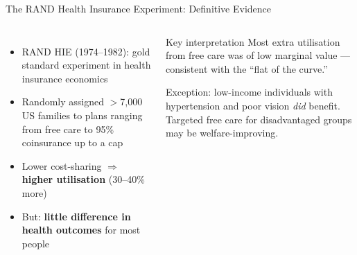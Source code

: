 \documentclass[aspectratio=169, 12pt]{beamer}
\begin{document}
\begin{frame}{The RAND Health Insurance Experiment: Definitive Evidence}
  \begin{columns}
      \small
      \begin{itemize}
        \item RAND HIE (1974--1982): gold standard experiment in health insurance economics
        \item Randomly assigned $>$7,000 US families to plans ranging from free care to
              95\% coinsurance up to a cap
        \item Lower cost-sharing $\Rightarrow$ \textbf{higher utilisation} (30--40\% more)
        \item But: \textbf{little difference in health outcomes} for most people
      \end{itemize}
      \begin{alertblock}{Key interpretation}
        \small Most extra utilisation from free care was of low marginal value --- consistent
        with the ``flat of the curve.''

        \medskip Exception: low-income individuals with hypertension and poor vision \emph{did}
        benefit. Targeted free care for disadvantaged groups may be welfare-improving.
      \end{alertblock}
  \end{columns}
\end{frame}

\end{document}
